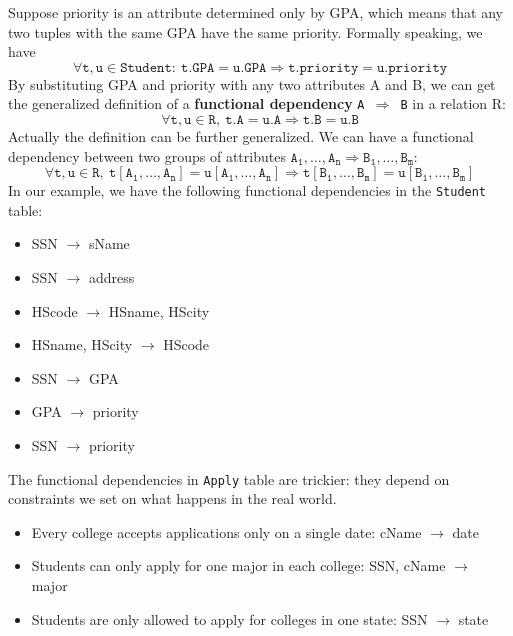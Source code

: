 Suppose priority is an attribute determined only by GPA, which means that any two tuples with the same GPA have the same priority. Formally speaking, we have
\begin{equation*}
\mathtt{\forall t,u \in Student:\:t.GPA = u.GPA\Rightarrow t.priority=u.priority}
\end{equation*}
By substituting GPA and priority with any two attributes A and B, we can get the generalized definition of a \textbf{functional dependency} \texttt{A $\Rightarrow$ B} in a relation R: 
\begin{equation*}
\mathtt{\forall t,u \in R,\:t.A = u.A\Rightarrow t.B=u.B}
\end{equation*}
Actually the definition can be further generalized. We can have a functional dependency between two groups of attributes $\mathtt{A_1,\dots,A_n\Rightarrow B_1,\dots,B_m}$:
\begin{equation*}
\mathtt{\forall t,u \in R,\:t[A_1,\dots,A_n] = u[A_1,\dots,A_n]\Rightarrow t[B_1,\dots,B_m]=u[B_1,\dots,B_m]}
\end{equation*}
In our example, we have the following functional dependencies in the \texttt{Student} table:
\begin{itemize}
\item SSN $\rightarrow$ sName
\item SSN $\rightarrow$ address
\item HScode $\rightarrow$ HSname, HScity
\item HSname, HScity $\rightarrow$ HScode
\item SSN $\rightarrow$ GPA
\item GPA $\rightarrow$ priority
\item SSN $\rightarrow$ priority
\end{itemize}
The functional dependencies in \texttt{Apply} table are trickier: they depend on constraints we set on what happens in the real world.
\begin{itemize}
\item Every college accepts applications only on a single date: cName $\rightarrow$ date
\item Students can only apply for one major in each college: SSN, cName $\rightarrow$ major
\item Students are only allowed to apply for colleges in one state: SSN $\rightarrow$ state
\end{itemize}
\ifx\PREAMBLE\undefined

\fi